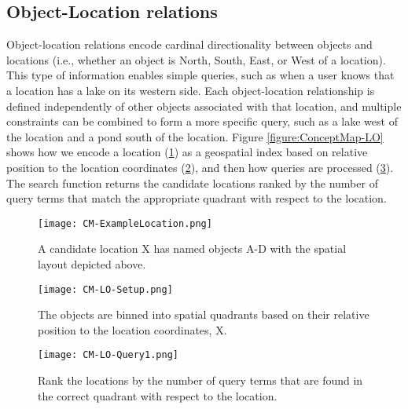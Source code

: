 \subsection{Object-Location relations}
Object-location relations encode cardinal directionality between objects and locations (i.e., whether an object is North, South, East, or West of a location). 
This type of information enables simple queries, such as when a user knows that a location has a lake on its western side. 
Each object-location relationship is defined independently of other objects associated with that location, and multiple constraints can be combined to form a more specific query, such as a lake west of the location and a pond south of the location.
Figure \ref{figure:ConceptMap-LO} shows how we encode a location (\ref{fig:CM-LO-Example}) as a geospatial index based on relative position to the location coordinates (\ref{fig:CM-LO-Setup}), and then how queries are processed (\ref{fig:CM-LO-Query}).
The search function returns the candidate locations ranked by the number of query terms that match the appropriate quadrant with respect to the location. 

\begin{figure*}[t]
    \centering
    \begin{subfigure}[t]{.25\textwidth}
        \texttt{[image: CM-ExampleLocation.png]}
        \caption{\small A candidate location X has named objects A-D with the spatial layout depicted above.} 
        \label{fig:CM-LO-Example}
    \end{subfigure}
    \hfill
    \begin{subfigure}[t]{.25\textwidth}
        \texttt{[image: CM-LO-Setup.png]}
        \caption{\small The objects are binned into spatial quadrants based on their relative position to the location coordinates, X.} 
        \label{fig:CM-LO-Setup}
    \end{subfigure}
    \hfill
        \begin{subfigure}[t]{.25\textwidth}
        \texttt{[image: CM-LO-Query1.png]}
        \caption{\small Rank the locations by the number of query terms that are found in the correct quadrant with respect to the location.}
        \label{fig:CM-LO-Query}
    \hfill
    \end{subfigure}
    \caption{\textbf{Object-Location Search Method. A Location-centric data structure (Figure \ref{fig:CM-LO-Setup}) is generated based on the cardinal relations between the objects and the location (Figure \ref{fig:CM-LO-Example}). Then a pictorial query is matched against the structure (Figure \ref{fig:CM-LO-Query}).}}\label{figure:ConceptMap-LO} 
\end{figure*}

